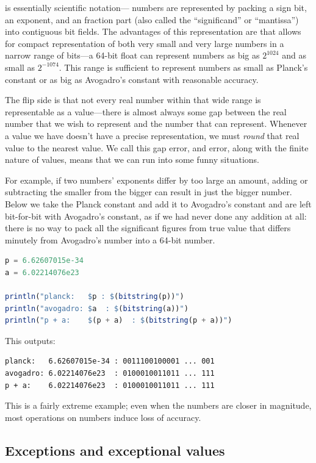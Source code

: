 \documentclass{juliacon}
\begin{document}
\Fp{} is essentially scientific notation---\fp{} numbers are represented by packing a sign bit, an exponent, and an fraction part (also called the ``significand'' or ``mantissa'') into contiguous bit fields.
The advantages of this representation are that allows for compact representation of both very small and very large numbers in a narrow range of bits---a 64-bit float can represent numbers as big as $2^{1024}$ and as small as $2^{-1074}$.
This range is sufficient to represent numbers as small as Planck's constant or as big as Avogadro's constant with reasonable accuracy.

The flip side is that not every real number within that wide range is representable as a \fp{} value---there is almost always some gap between the real number that we wish to represent and the \fp{} number that can represent.
Whenever a value we have doesn't have a precise representation, we must \emph{round} that real value to the nearest \fp{} value.
We call this gap error, and error, along with the finite nature of \fp{} values, means that we can run into some funny situations.

For example, if two numbers' exponents differ by too large an amount, adding or subtracting the smaller from the bigger can result in just the bigger number.
Below we take the Planck constant and add it to Avogadro's constant and are left bit-for-bit with Avogadro's constant, as if we had never done any addition at all: there is no way to pack all the significant figures from true value that differs minutely from Avogadro's number into a 64-bit \fp{} number.

\begin{lstlisting}[language = Julia]
p = 6.62607015e-34
a = 6.02214076e23

println("planck:   $p : $(bitstring(p))")
println("avogadro: $a  : $(bitstring(a))")
println("p + a:    $(p + a)  : $(bitstring(p + a))")
\end{lstlisting}

This outputs:

\begin{lstlisting}
planck:   6.62607015e-34 : 0011100100001 ... 001
avogadro: 6.02214076e23  : 0100010011011 ... 111
p + a:    6.02214076e23  : 0100010011011 ... 111
\end{lstlisting}

This is a fairly extreme example; even when the numbers are closer in magnitude, most operations on \fp{} numbers induce loss of accuracy.

\subsection{Exceptions and exceptional values}
\end{document}
